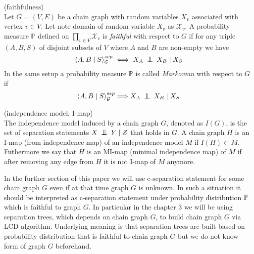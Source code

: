 \begin{defi} \label{faithDef} (faithfulness) \\
	Let $G = (V, E)$ be a chain graph with random variables $X_v$ associated with vertex $v \in V$. Let note domain of 
	random variable $X_v$ as $\mathcal{X}_v$. A probability measure $\mathbb{P}$ 
	defined on $\prod_{v \in V} \mathcal{X}_v$ is \textit{faithful} with respect to $G$ if 
	for any triple $(A, B, S)$ of disjoint subsets of $V$ where $A$ and $B$ are non-empty we have
	\begin{equation}
		\cSep{A}{B}{S}{G} \iff X_A \bigCI X_B \mid X_S
	\end{equation}
	In the same setup a probability measure $\mathbb{P}$ is called \textit{Markovian} with respect to $G$ if
	\begin{equation}
		\cSep{A}{B}{S}{G} \Longrightarrow X_A \bigCI X_B \mid X_S
	\end{equation}
\end{defi}


\begin{defi} (independence model, I-map) \\ 
	The independence model induced by a chain graph $G$, denoted as $I(G)$, is the set of separation statements
	$X \bigCI Y \mid Z$ that holds in $G$. A chain graph $H$ is an I-map (from independence map) of an 
	independence model $M$ if $I(H) \subset M$. Futhermore we say that $H$ is an MI-map (minimal independence map)
	of $M$ if after removing any edge from $H$ it is not I-map of $M$ anymore.
\end{defi}

\begin{remark}
	\normalfont
	In the further section of this paper we will use c-separation statement for some chain graph $G$ even if
	at that time graph $G$ is unknown. In such a situation it should be interpreted as c-separation statement under 
	probability distribution $\mathbb{P}$ which is faithful to graph $G$. In particular in the chapter 3
	we will be using separation trees, which depends on chain graph $G$, to build chain graph $G$ via LCD algorithm.
	Underlying meaning is that separation trees are built based on probability distribution that is faithful to 
	chain graph $G$ but we do not know form of graph $G$ beforehand. 
\end{remark}


